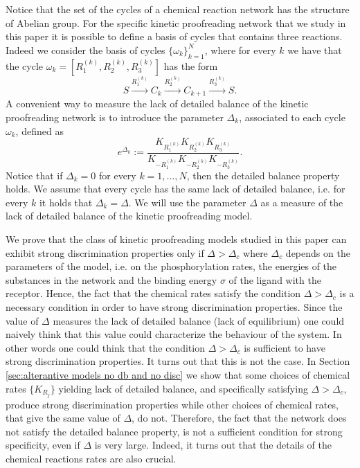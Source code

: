 \documentclass{article}
\numberwithin{equation}{section}
\theoremstyle{plain}
\begin{document}
Notice that the set of the cycles of a  chemical reaction network has the structure of Abelian group. For the specific  kinetic proofreading network that we study in this paper it is possible to define a basis of cycles that contains three reactions. Indeed we consider the basis  of cycles $\{ \omega_k \}_{k=1}^N$, where for every $k $ we have that the cycle $\omega _k=[R_1^{(k)}, R_2^{(k)}, R_3^{(k)}]$ has the form 
\[
S \overset{R_1^{(k)}} \longrightarrow C_k  \overset{R_2^{(k)}}\longrightarrow C_{k+1} \overset{R_3^{(k)}}\longrightarrow S.
\]
A convenient way to measure the lack of detailed balance of the kinetic proofreading network is to introduce the parameter $\Delta_k$, associated to each cycle $\omega_k$,  defined as 
\begin{equation} \label{delta in cylces}
e^{\Delta_{k} } := \frac{ K_{R_1^{(k)}}K_{R_2^{(k)}} K_{R_3^{(k)}}  }{ K_{- R_1^{(k)} }K_{- R_2^{(k)} }K_{- R_3^{(k)} }}. 
\end{equation}
Notice that if $\Delta_{k} =0$ for every $k=1, \dots , N $, then the detailed balance property holds. We assume that every cycle has the same lack of detailed balance, i.e. for every $k $ it holds that $\Delta_k = \Delta $. 
We will use the parameter $\Delta$ as a measure of the lack of detailed balance of the kinetic proofreading model. 

We prove that the class of kinetic proofreading models studied in this paper can exhibit strong discrimination properties only if $\Delta > \Delta_c$ where $\Delta_c$ depends on the parameters of the model, i.e. on the  phosphorylation rates, the energies of the substances in the network and the binding energy $\sigma$ of the ligand with the receptor.
Hence, the fact that the chemical rates satisfy the condition $\Delta > \Delta_c$ is a necessary condition in order to have strong discrimination properties. 
Since the value of $\Delta$ measures the lack of detailed balance (lack of equilibrium) one could naively think that this value could characterize the behaviour of the system. In other words one could think that the condition $\Delta > \Delta_c $ is sufficient to have strong discrimination properties. It turns out that this is not the case. In Section \ref{sec:alterantive models no db and no disc} we show that some choices of chemical rates $\{ K_{R_j }  \} $ yielding lack of detailed balance, and specifically satisfying $\Delta > \Delta_c $, produce strong discrimination properties while other choices of chemical rates, that give the same value of $\Delta$, do not.  
Therefore, the fact that the network does not satisfy the detailed balance property, is not a sufficient condition for strong specificity, even if $\Delta $ is very large.  Indeed, it turns out that the details of the chemical reactions rates are also crucial. 
\end{document}
